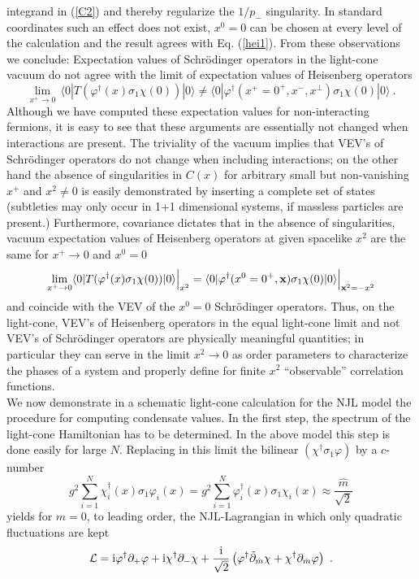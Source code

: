 \documentclass[a4paper,12pt]{article}
\begin{document}
integrand in  (\ref{C2}) and thereby regularize the $1/p_{-}$ singularity. In standard
coordinates such an effect does not exist, $x^{0}=0$ can be chosen at every level
of the calculation and the result agrees with Eq. (\ref{hei1}).
From these observations we conclude: Expectation values of Schr\"odinger operators in the
light-cone vacuum do not agree with the limit of  expectation values of Heisenberg operators
\begin{equation}
\label{schei}
\lim_{x^{+}\rightarrow 0}\, \langle 0|T (\varphi ^{\dagger}(x)\sigma_{1} \chi(0) ) | 0 \rangle \neq
\langle 0 | \varphi ^{\dagger} (x^{+} = 0^{+}, x^{-}, x^{\perp} )\sigma_{1} \chi(0)  | 0 \rangle \ .
\end{equation}
Although we have computed these expectation values for non-interacting fermions, it is easy to
see that these arguments are essentially not changed when interactions are present. The triviality
of the vacuum implies that VEV's of Schr\"odinger operators do not change when including
interactions; on the other hand the absence of singularities in $C(x)$ for arbitrary small but
non-vanishing $ x^{+}$ and $ x^{2} \neq 0$ is easily demonstrated by inserting a complete
set of states (subtleties may only occur in 1+1 dimensional systems,
if massless particles are present.)
Furthermore, covariance dictates that in the absence of singularities,  vacuum expectation values
of Heisenberg operators at given spacelike $x^{2}$ are the same for $x^{+}\rightarrow 0$ and
$x^{0}= 0$
\begin{displaymath}
\lim_{x^{+}\rightarrow  0}\langle 0 | T (\varphi ^{\dagger}(x)\sigma_{1} \chi(0) ) | 0\rangle
\Big|_{x^{2}}=\langle  0 | \varphi ^{\dagger} (x^{0} = 0^{+},{\bf x} )\sigma_{1} \chi(0)  | 0
\rangle\Big|_{{\bf x}^{2}=-x^{2}}
\end{displaymath}
and coincide with the VEV of the $x^{0}= 0$ Schr\"odinger operators. Thus, on the light-cone,
VEV's of Heisenberg operators in the equal light-cone limit and not VEV's of Schr\"odinger
operators are physically meaningful quantities; in particular they can serve in the limit $x^{2}
\rightarrow 0$ as order parameters to characterize the phases of a system and properly define
for finite $x^{2}$ ``observable'' correlation functions.\\
We now demonstrate in a schematic light-cone calculation for the NJL model the
procedure for computing  condensate values. In the first step, the spectrum  of the light-cone
Hamiltonian has to be determined. In the above model this step is done easily for large $N$.
Replacing  in this limit the bilinear $(\chi^{\dagger}\sigma_{1}\varphi)$ by a $c$-number
\begin{equation}
 \label{mass}
 g^{2}\sum_{i=1}^{N}\chi^{\dagger}_{i}(x)\sigma_{1}\varphi_{i}(x) = g^{2}\sum_{i=1}^{N}
\varphi^{\dagger}_{i}(x)\sigma_{1}\chi_{i}(x)\approx\frac{\hat{m}}{\sqrt{2}}\end{equation}
yields for $m=0$, to leading order, the NJL-Lagrangian in which only quadratic fluctuations are kept
$${\cal L} = {\rm  i} \varphi ^{\dagger} \partial_{+} \varphi +{\rm  i} \chi ^{\dagger} \partial_{-}
\chi + \frac{{\rm i}}{\sqrt{2}}\left(  \varphi ^{\dagger} \tilde{\partial}_{\hat{m}}  \chi  +
\chi ^{\dagger} \partial_{\hat{m}} \varphi\right)\ .$$
\end{document}
